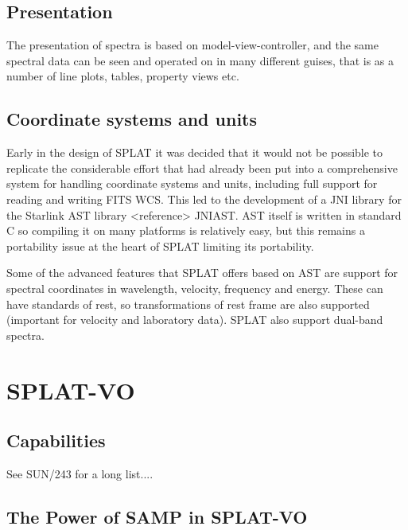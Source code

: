 \documentclass[final,authoryear,5p,times,twocolumn]{elsarticle}
\begin{document}
\subsection{Presentation}

The presentation of spectra is based on model-view-controller, and the same
spectral data can be seen and operated on in many different guises, that is as
a number of line plots, tables, property views etc.

\subsection{Coordinate systems and units}

Early in the design of SPLAT it was decided that it would not be possible to
replicate the considerable effort that had already been put into a
comprehensive system for handling coordinate systems and units, including full
support for reading and writing FITS WCS. This led to the development of a JNI
library for the Starlink AST library <reference> JNIAST. AST itself is written
in standard C so compiling it on many platforms is relatively easy, but this
remains a portability issue at the heart of SPLAT limiting its portability.

Some of the advanced features that SPLAT offers based on AST are support for
spectral coordinates in wavelength, velocity, frequency and energy. These can
have standards of rest, so transformations of rest frame are also supported
(important for velocity and laboratory data). SPLAT also support dual-band
spectra.


\section{SPLAT-VO}

\subsection{Capabilities}
See SUN/243 for a long list....


\subsection{The Power of SAMP in SPLAT-VO}
\end{document}
